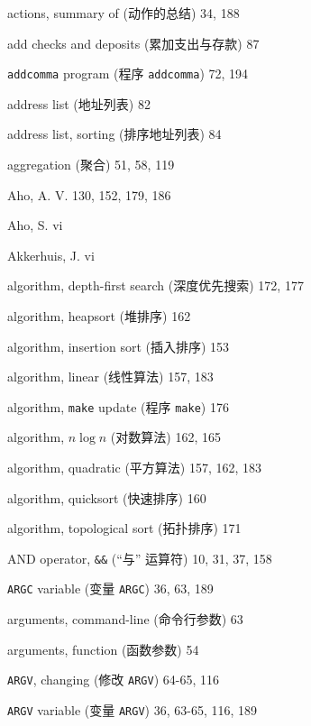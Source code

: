\begin{multicols}{2}
\hangindent=2pc  actions, summary of (动作的总结) 34, 188

\hangindent=2pc  add checks and deposits (累加支出与存款) 87

\hangindent=2pc  \verb'addcomma' program (程序 \verb'addcomma') 72, 194

\hangindent=2pc  address list (地址列表) 82

\hangindent=2pc  address list, sorting (排序地址列表) 84

\hangindent=2pc  aggregation (聚合) 51, 58, 119

\hangindent=2pc  Aho, A. V. 130, 152, 179, 186

\hangindent=2pc  Aho, S. vi

\hangindent=2pc  Akkerhuis, J. vi

\hangindent=2pc  algorithm, depth-first search (深度优先搜索) 172, 177

\hangindent=2pc  algorithm, heapsort (堆排序) 162

\hangindent=2pc  algorithm, insertion sort (插入排序) 153

\hangindent=2pc  algorithm, linear (线性算法) 157, 183

\hangindent=2pc  algorithm, \verb'make' update (程序
\verb'make') 176

\hangindent=2pc  algorithm, $n\log n$ (对数算法) 162, 165

\hangindent=2pc  algorithm, quadratic (平方算法) 157, 162, 183

\hangindent=2pc  algorithm, quicksort (快速排序) 160

\hangindent=2pc  algorithm, topological sort (拓扑排序) 171

\hangindent=2pc  AND operator, \verb'&&' (``与'' 运算符) 10, 31, 37, 158

\hangindent=2pc  \verb'ARGC' variable (变量 \verb'ARGC') 36, 63, 189

\hangindent=2pc  arguments, command-line (命令行参数) 63

\hangindent=2pc  arguments, function (函数参数) 54

\hangindent=2pc  \verb'ARGV', changing (修改 \verb'ARGV') 64-65, 116

\hangindent=2pc  \verb'ARGV' variable (变量 \verb'ARGV') 36, 63-65, 116, 189


\end{multicols}
